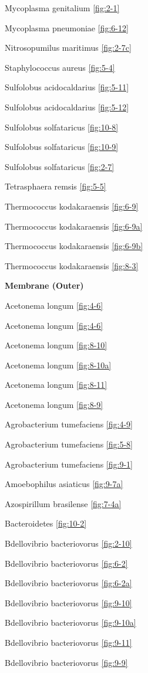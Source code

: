 \documentclass[]{tufte-book}
\begin{document}
Mycoplasma genitalium \ref{fig:2-1}

Mycoplasma pneumoniae \ref{fig:6-12}

Nitrosopumilus maritimus \ref{fig:2-7c}

Staphylococcus aureus \ref{fig:5-4}

Sulfolobus acidocaldarius \ref{fig:5-11}

Sulfolobus acidocaldarius \ref{fig:5-12}

Sulfolobus solfataricus \ref{fig:10-8}

Sulfolobus solfataricus \ref{fig:10-9}

Sulfolobus solfataricus \ref{fig:2-7}

Tetrasphaera remsis \ref{fig:5-5}

Thermococcus kodakaraensis \ref{fig:6-9}

Thermococcus kodakaraensis \ref{fig:6-9a}

Thermococcus kodakaraensis \ref{fig:6-9b}

Thermococcus kodakaraensis \ref{fig:8-3}

\textbf{Membrane (Outer)}

Acetonema longum \ref{fig:4-6}

Acetonema longum \ref{fig:4-6}

Acetonema longum \ref{fig:8-10}

Acetonema longum \ref{fig:8-10a}

Acetonema longum \ref{fig:8-11}

Acetonema longum \ref{fig:8-9}

Agrobacterium tumefaciens \ref{fig:4-9}

Agrobacterium tumefaciens \ref{fig:5-8}

Agrobacterium tumefaciens \ref{fig:9-1}

Amoebophilus asiaticus \ref{fig:9-7a}

Azospirillum brasilense \ref{fig:7-4a}

Bacteroidetes \ref{fig:10-2}

Bdellovibrio bacteriovorus \ref{fig:2-10}

Bdellovibrio bacteriovorus \ref{fig:6-2}

Bdellovibrio bacteriovorus \ref{fig:6-2a}

Bdellovibrio bacteriovorus \ref{fig:9-10}

Bdellovibrio bacteriovorus \ref{fig:9-10a}

Bdellovibrio bacteriovorus \ref{fig:9-11}

Bdellovibrio bacteriovorus \ref{fig:9-9}
\end{document}
